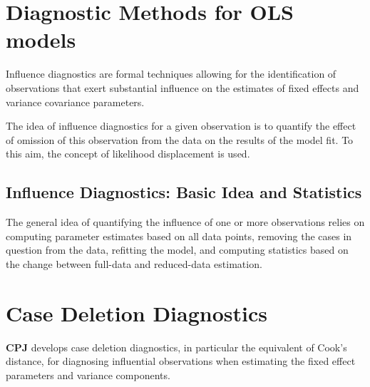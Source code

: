 \documentclass[00-ResidualsMain.tex]{subfiles}
\begin{document}
	
	\newpage
	\section*{Diagnostic Methods for OLS models}
	Influence diagnostics are formal techniques allowing for the identification of observations that exert substantial 
	influence on the estimates of fixed effects and variance covariance parameters. 
	
	The idea of influence diagnostics for a given observation is to quantify the effect of omission of this observation 
	from the data on the results of the model fit. To this aim, the concept of likelihood displacement is used. 
	
	
	
	\subsection*{Influence Diagnostics: Basic Idea and Statistics} %
	
	The general idea of quantifying the influence of one or more observations relies on computing parameter estimates based on all data points, removing the cases in question from the data, refitting the model, and computing statistics based on the change between full-data and reduced-data estimation. 
	
	\newpage
	\section{Case Deletion Diagnostics} %
	
	\textbf{CPJ} develops  case deletion diagnostics, in particular the equivalent of  Cook's distance, for diagnosing influential observations when estimating the fixed effect parameters and variance components.
	
\end{document}

